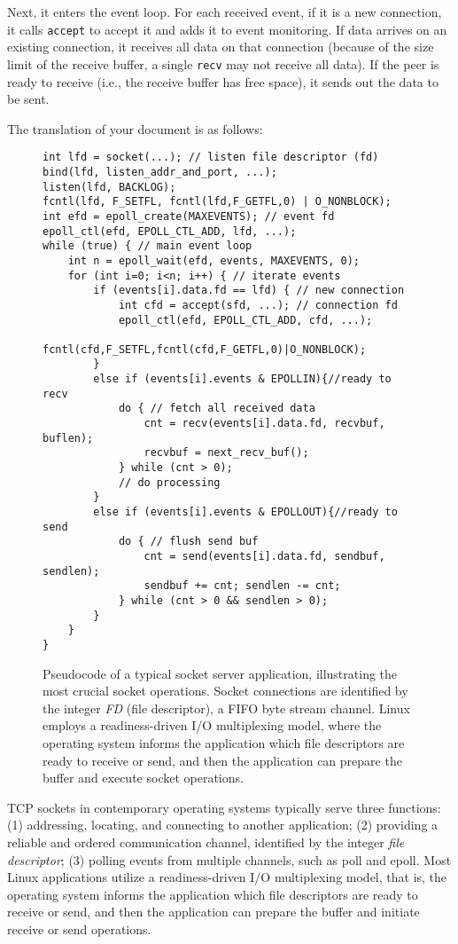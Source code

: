 Next, it enters the event loop. For each received event, if it is a new connection, it calls \texttt{accept} to accept it and adds it to event monitoring. If data arrives on an existing connection, it receives all data on that connection (because of the size limit of the receive buffer, a single \texttt{recv} may not receive all data). If the peer is ready to receive (i.e., the receive buffer has free space), it sends out the data to be sent.

The translation of your document is as follows:

\begin{figure}[htbp]
\small
\begin{lstlisting}[style=myCStyle]
int lfd = socket(...); // listen file descriptor (fd)
bind(lfd, listen_addr_and_port, ...);
listen(lfd, BACKLOG);
fcntl(lfd, F_SETFL, fcntl(lfd,F_GETFL,0) | O_NONBLOCK);
int efd = epoll_create(MAXEVENTS); // event fd
epoll_ctl(efd, EPOLL_CTL_ADD, lfd, ...);
while (true) { // main event loop
	int n = epoll_wait(efd, events, MAXEVENTS, 0);
	for (int i=0; i<n; i++) { // iterate events
		if (events[i].data.fd == lfd) { // new connection
			int cfd = accept(sfd, ...); // connection fd
			epoll_ctl(efd, EPOLL_CTL_ADD, cfd, ...);
			fcntl(cfd,F_SETFL,fcntl(cfd,F_GETFL,0)|O_NONBLOCK);
		}
		else if (events[i].events & EPOLLIN){//ready to recv
			do { // fetch all received data
				cnt = recv(events[i].data.fd, recvbuf, buflen);
				recvbuf = next_recv_buf();
			} while (cnt > 0);
			// do processing
		}
		else if (events[i].events & EPOLLOUT){//ready to send
			do { // flush send buf
				cnt = send(events[i].data.fd, sendbuf, sendlen);
				sendbuf += cnt; sendlen -= cnt;
			} while (cnt > 0 && sendlen > 0);
		}
	}
}
\end{lstlisting}

\caption{Pseudocode of a typical socket server application, illustrating the most crucial socket operations. Socket connections are identified by the integer \emph {FD} (file descriptor), a FIFO byte stream channel. Linux employs a readiness-driven I/O multiplexing model, where the operating system informs the application which file descriptors are ready to receive or send, and then the application can prepare the buffer and execute socket operations.}
\label{socksdirect:fig:socket-pseudo-code}
\end{figure}

TCP sockets in contemporary operating systems typically serve three functions: (1) addressing, locating, and connecting to another application; (2) providing a reliable and ordered communication channel, identified by the integer \emph {file descriptor}; (3) polling events from multiple channels, such as poll and epoll. Most Linux applications utilize a readiness-driven I/O multiplexing model, that is, the operating system informs the application which file descriptors are ready to receive or send, and then the application can prepare the buffer and initiate receive or send operations.

